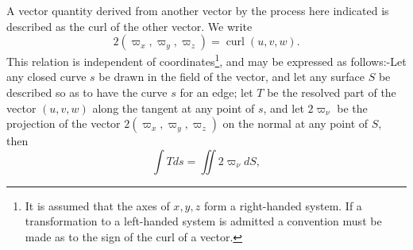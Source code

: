 A vector quantity derived from another vector by the process here indicated is
described as the curl of the other vector. We write
\begin{equation}\label{eq:16}
2\left(\varpi_x, \varpi_y, \varpi_z\right)=\operatorname{curl}(u, v, w).
\end{equation}
This relation is independent of coordinates\footnote{It is assumed that the
axes of \(x, y, z\) form a right-handed system.  If a transformation to a
left-handed system is admitted a convention must be made as to the sign of
the curl of a vector.}, and may be expressed as
follows:-Let any closed curve \(s\) be drawn in the field of the vector, and
let any surface \(S\) be described so as to have the curve \(s\) for an edge;
let \(T\) be the resolved part of the vector \((u, v, w)\) along the tangent at
any point of \(s\), and let \(2 \varpi_\nu\) be the projection of the vector
\(2\left(\varpi_x, \varpi_y, \varpi_z\right)\) on the normal at any point of
\(S\), then
\begin{equation}\label{eq:17}
\int T d s=\iint 2 \varpi_\nu d S,
\end{equation}
